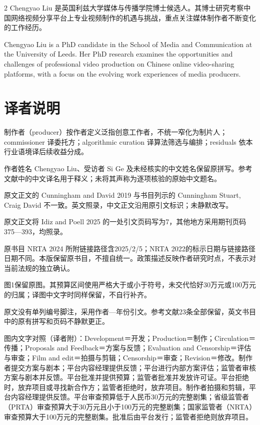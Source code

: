 \documentclass[10pt,a4paper]{article}
\begin{document}
\begin{paracol}{2}
Chengyao Liu 是英国利兹大学媒体与传播学院博士候选人。其博士研究考察中国网络视频分享平台上专业视频制作的机遇与挑战，重点关注媒体制作者不断变化的工作经历。\par
\switchcolumn
Chengyao Liu is a PhD candidate in the School of Media and Communication at the University of Leeds. Her PhD research examines the opportunities and challenges of professional video production on Chinese online video-sharing platforms, with a focus on the evolving work experiences of media producers.\par
\switchcolumn*
\end{paracol}
\section*{译者说明}
制作者（producer）按作者定义泛指创意工作者，不统一窄化为制片人；commissioner 译委托方；algorithmic curation 译算法筛选与编排；residuals 依本行业语境译后续收益分成。\par
作者姓名 Chengyao Liu、受访者 Si Ge 及未经核实的中文姓名保留原拼写。参考文献中的中文译名用于释义；未将其声称为逐项核验的原始中文题名。\par
原文正文的 Cunningham and David 2019 与书目列示的 Cunningham Stuart, Craig David 不一致。英文照录，中文正文沿用原引文标识；未静默改写。\par
原文正文将 Idiz and Poell 2025 的一处引文页码写为7，其他地方采用期刊页码375—393，均照录。\par
原书目 NRTA 2024 所附链接路径含2025/2/5；NRTA 2022的标示日期与链接路径日期不同。本版保留原书目，不擅自统一。政策描述反映作者研究时点，不表示对当前法规的独立确认。\par
图1保留原图。其预算区间使用严格大于或小于符号，未交代恰好30万元或100万元的归属；译图中文字时同样保留，不自行补齐。\par
原文没有单列编号脚注，采用作者—年份引文。参考文献23条全部保留，英文书目中的原有拼写和页码不静默更正。\par
图内文字对照（译者附）：Development＝开发；Production＝制作；Circulation＝传播；Proposals and Feedback＝方案与反馈；Evaluation and Censorship＝评估与审查；Film and edit＝拍摄与剪辑；Censorship＝审查；Revision＝修改。制作者提交方案与剧本；平台内容经理提供反馈；平台进行内部方案评估；监管者审核方案与剧本并反馈。平台批准并提供预算；监管者批准并发放许可证。平台拒绝时，放弃项目或寻找新合作方；监管者拒绝时，放弃项目。制作者拍摄和剪辑，平台内容经理提供反馈。平台审查预算低于人民币30万元的完整剧集；省级监管者（PRTA）审查预算大于30万元且小于100万元的完整剧集；国家监管者（NRTA）审查预算大于100万元的完整剧集。批准后由平台发行；监管者拒绝则放弃项目。\par
\end{document}
